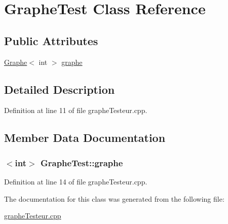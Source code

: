 \hypertarget{class_graphe_test}{
\section{GrapheTest Class Reference}
\label{class_graphe_test}
}
\subsection*{Public Attributes}
\begin{DoxyCompactItemize}
\item 
\hyperlink{class_graphe}{Graphe}$<$ int $>$ \hyperlink{class_graphe_test_ab5f00876eac6820ea2fdd07133991a8b}{graphe}
\end{DoxyCompactItemize}


\subsection{Detailed Description}


Definition at line 11 of file grapheTesteur.cpp.



\subsection{Member Data Documentation}
\hypertarget{class_graphe_test_ab5f00876eac6820ea2fdd07133991a8b}{
\subsubsection[{graphe}]{$<$int$>$ {\bf GrapheTest::graphe}}}
\label{class_graphe_test_ab5f00876eac6820ea2fdd07133991a8b}


Definition at line 14 of file grapheTesteur.cpp.



The documentation for this class was generated from the following file:\begin{DoxyCompactItemize}
\item 
\hyperlink{graphe_testeur_8cpp}{grapheTesteur.cpp}\end{DoxyCompactItemize}
